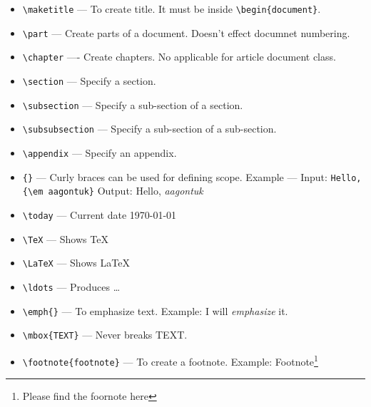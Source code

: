\documentclass[11pt]{article}
\begin{document}
\begin{itemize}
		\item\verb=\maketitle= --- To create title. It must be inside \verb=\begin{document}=.
		\item\verb=\part= --- Create parts of a document. Doesn't effect documnet numbering.
		\item\verb=\chapter= ---- Create chapters. No applicable for article document class.
		\item\verb=\section= --- Specify a section.
		\item\verb=\subsection= --- Specify a sub-section of a section.
		\item\verb=\subsubsection= --- Specify a sub-section of a sub-section.
		\item\verb=\appendix= --- Specify an appendix.
		\item\verb={}= --- Curly braces can be used for defining scope. Example --- Input: \verb=Hello, {\em aagontuk}= Output: Hello, {\em aagontuk}
		\item\verb=\today= --- Current date \today
		\item\verb=\TeX= --- Shows \TeX
		\item\verb=\LaTeX= --- Shows \LaTeX
		\item\verb=\ldots= --- Produces  \ldots
		\item\verb=\emph{}= --- To emphasize text. Example: I will \emph{emphasize} it.
		\item\verb=\mbox{TEXT}= --- Never breaks TEXT.\ 
		\item\verb=\footnote{footnote}= --- To create a footnote. Example: Footnote\footnote{Please find the foornote here}

\end{itemize}
\end{document}
